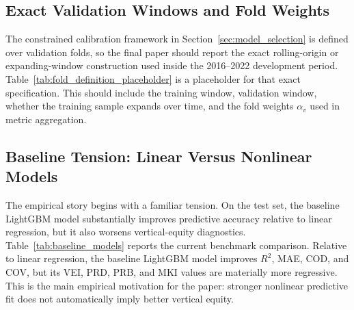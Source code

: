 \documentclass[12pt]{article}
\theoremstyle{plain}
\theoremstyle{definition}
\begin{document}
\begin{table}[t]
\centering
\caption{Placeholder for sample construction summary. Replace with the final counts and main filtering rules from the experiment pipeline.}
\label{tab:sample_construction_placeholder}
\end{table}

\subsection{Exact Validation Windows and Fold Weights}

The constrained calibration framework in Section~\ref{sec:model_selection} is defined over validation folds, so the final paper should report the exact rolling-origin or expanding-window construction used inside the 2016--2022 development period. Table~\ref{tab:fold_definition_placeholder} is a placeholder for that exact specification. This should include the training window, validation window, whether the training sample expands over time, and the fold weights \(\alpha_v\) used in metric aggregation.

\begin{table}[t]
\centering
\caption{Placeholder for exact validation-window construction.}
\label{tab:fold_definition_placeholder}
\end{table}

\subsection{Baseline Tension: Linear Versus Nonlinear Models}

The empirical story begins with a familiar tension. On the test set, the baseline LightGBM model substantially improves predictive accuracy relative to linear regression, but it also worsens vertical-equity diagnostics. Table~\ref{tab:baseline_models} reports the current benchmark comparison. Relative to linear regression, the baseline LightGBM model improves \(R^2\), MAE, COD, and COV, but its VEI, PRD, PRB, and MKI values are materially more regressive. This is the main empirical motivation for the paper: stronger nonlinear predictive fit does not automatically imply better vertical equity.
\end{document}
